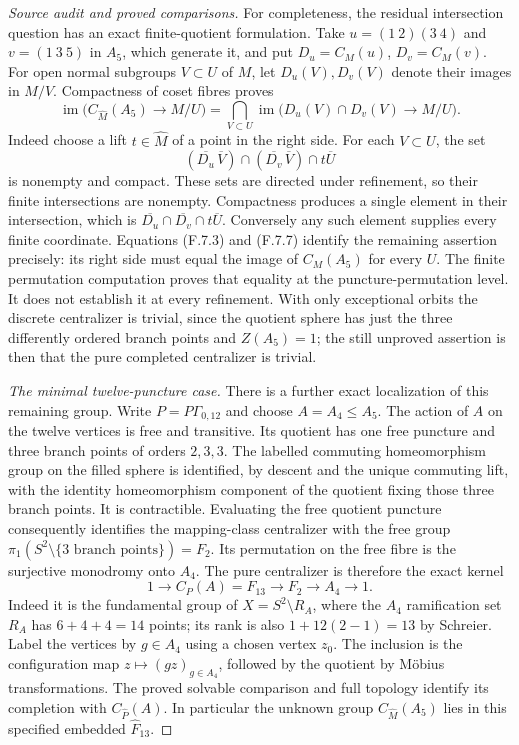 \begin{proof}[Source audit and proved comparisons]
For completeness, the residual intersection question
has an exact finite-quotient formulation. Take
$u=(1\ 2)(3\ 4)$ and $v=(1\ 3\ 5)$ in $A_5$, which
generate it, and put $D_u=C_M(u)$, $D_v=C_M(v)$.
For open normal subgroups $V\subset U$ of $M$, let
$D_u(V),D_v(V)$ denote their images in $M/V$.
Compactness of coset fibres proves
\[
 \operatorname{im}\bigl(C_{\widehat M}(A_5)\to M/U\bigr)
 =\bigcap_{V\subset U}
       \operatorname{im}\bigl(D_u(V)\cap D_v(V)\to M/U\bigr).
                                                               \tag{F.7.7}
\]
Indeed choose a lift $t\in\widehat M$ of a point
in the right side. For each $V\subset U$, the set
\[
 (\overline{D_u}\,\overline V)\cap
 (\overline{D_v}\,\overline V)\cap t\overline U
\]
is nonempty and compact. These sets are directed
under refinement, so their finite intersections
are nonempty. Compactness produces a single element
in their intersection, which is
$\overline{D_u}\cap\overline{D_v}\cap t\overline U$.
Conversely any such element supplies every finite
coordinate. Equations (F.7.3) and (F.7.7) identify
the remaining assertion precisely: its right side
must equal the image of $C_M(A_5)$ for every $U$.
The finite permutation computation proves that
equality at the puncture-permutation level. It does
not establish it at every refinement. With only
exceptional orbits the discrete centralizer is
trivial, since the quotient sphere has just the
three differently ordered branch points and
$Z(A_5)=1$; the still unproved assertion is then
that the pure completed centralizer is trivial.

\emph{The minimal twelve-puncture case.}
There is a further exact localization of this remaining group.
Write $P=P\Gamma_{0,12}$ and choose $A=A_4\leq A_5$.
The action of $A$ on the twelve vertices is free and transitive.
Its quotient has one free puncture and three branch points of
orders $2,3,3$. The labelled commuting homeomorphism group on
the filled sphere is identified, by descent and the unique
commuting lift, with the identity homeomorphism component of
the quotient fixing those three branch points. It is
contractible. Evaluating the free quotient puncture consequently
identifies the mapping-class centralizer with the free group
$\pi_1(S^2\setminus\{3\text{ branch points}\})=F_2$.
Its permutation on the free fibre is the surjective monodromy
onto $A_4$. The pure centralizer is therefore the exact kernel
\[
 1\longrightarrow C_P(A)=F_{13}\longrightarrow F_2
                    \longrightarrow A_4\longrightarrow1.
                                                               \tag{F.7.8}
\]
Indeed it is the fundamental group of
$X=S^2\setminus R_A$, where the $A_4$ ramification set $R_A$
has $6+4+4=14$ points; its rank is also
$1+12(2-1)=13$ by Schreier. Label the vertices by $g\in A_4$
using a chosen vertex $z_0$. The inclusion is the configuration
map $z\mapsto(gz)_{g\in A_4}$, followed by the quotient by
M\"obius transformations. The proved solvable comparison and
full topology identify its completion with $C_{\widehat P}(A)$.
In particular the unknown group $C_{\widehat M}(A_5)$ lies in
this specified embedded $\widehat F_{13}$.


\end{proof}
